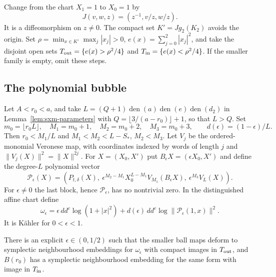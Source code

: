 Change from the chart $X_1=1$ to $X_0=1$ by
\[
 J(v,w,z)=(z^{-1},v/z,w/z).
\]
It is a diffeomorphism on $z\ne0$. The compact set $K'=Jg_2(K_2)$ avoids the origin. Set
$\rho=\min_{x\in K'}\max_j|x_j|>0$, $e(x)=\sum_{j=0}^2|x_j|^2$, and take the disjoint open sets
$T_{\rm out}=\{e(x)>\rho^2/4\}$ and $T_{\rm in}=\{e(x)<\rho^2/4\}$. If the smaller family is empty, omit these steps.

\subsection{The polynomial bubble}\label{sec:sxr-bubble}

Let $A<r_0<a$, and take $L=(Q+1)\operatorname{den}(a)\operatorname{den}(e)\operatorname{den}(d_2)$ in
Lemma~\ref{lem:sxm-parameters} with $Q=\lfloor3/(a-r_0)\rfloor+1$, so that $L>Q$. Set
\[
 m_0=\lfloor r_0L\rfloor,\quad M_1=m_0+1,\quad M_2=m_0+2,\quad M_3=m_0+3,
 \qquad d(\epsilon)=(1-\epsilon)/L.
\]
Then $r_0<M_1/L$ and $M_1<M_2<L-S_*$, $M_2<M_3$.
Let $V_j$ be the ordered-monomial Veronese map, with coordinates indexed by words of length $j$
and $\|V_j(X)\|^2=\|X\|^{2j}$.
For $X=(X_0,X')$ put $B_\epsilon X=(\epsilon X_0,X')$ and define the degree-$L$
polynomial vector
\begin{equation}\label{eq:sxr-bubble-polynomial}
 \mathcal P_\epsilon(X)=
 \left(P_{t,\delta}(X),\
       \epsilon^{M_2-M_1}X_0^{L-M_1}V_{M_1}(B_\epsilon X),\
       \epsilon^{M_3}V_L(X)\right).
\end{equation}
For $\epsilon\ne0$ the last block, hence $\mathcal P_\epsilon$, has no nontrivial zero.
In the distinguished affine chart define
\begin{equation}\label{eq:sxr-degree-form}
 \omega_\epsilon=
 \epsilon\,dd^c\log(1+|x|^2)
       +d(\epsilon)\,dd^c\log\|\mathcal P_\epsilon(1,x)\|^2.
\end{equation}
It is Kähler for $0<\epsilon<1$.

\begin{proposition}\label{prop:sxr-bubble}
There is an explicit $\epsilon\in(0,1/2)$ such that the smaller ball maps deform to symplectic
neighbourhood embeddings for $\omega_\epsilon$ with compact images in $T_{\rm out}$, and $B(r_0)$
has a symplectic neighbourhood embedding for the same form with image in $T_{\rm in}$.
\end{proposition}

